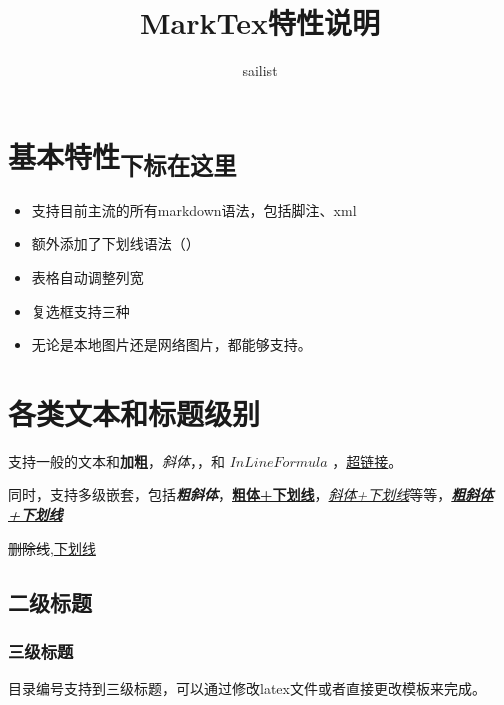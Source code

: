 \documentclass{article}%
\title{MarkTex特性说明}%
\author{sailist}%
\begin{document}
%
\normalsize%
\maketitle%
%
\tableofcontents
\newpage%

%
%
%

%
%
%
\section{基本特性\textsubscript{下标在这里}}%

%

%

%
\begin{itemize}%
\item%
支持目前主流的所有markdown语法，包括脚注、xml%
\item%
额外添加了下划线语法（）%
\item%
表格自动调整列宽%
\item%
复选框支持三种%
\item%
无论是本地图片还是网络图片，都能够支持。%
\end{itemize}%

%
%

%

%
\section{各类文本和标题级别}%

%
支持一般的文本和\textbf{加粗}，\textit{斜体}，，和 $InLine Formula$ ，\href{http://github.com}{超链接}。%

%
同时，支持多级嵌套，包括\textbf{\textit{粗斜体}}，\textbf{\underline{粗体+下划线}}，\textit{\underline{斜体+下划线}}等等，\textbf{\textit{\underline{粗斜体+下划线}}}%

%
\sout{删除线},\underline{下划线}%

%
\subsection{二级标题}%

%

%
\subsubsection{三级标题}%

%
目录编号支持到三级标题，可以通过修改latex文件或者直接更改模板来完成。%
\end{document}
